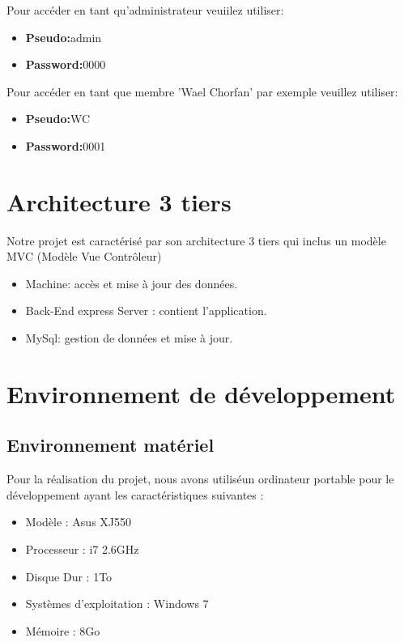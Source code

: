  Pour acc\'{e}der en tant qu'administrateur veuiilez utiliser:

  \begin{itemize}
    \item {\textbf{ Pseudo:}admin}
    \item {\textbf{ Password:}0000}
  \end{itemize}


  Pour acc\'{e}der en tant que membre 'Wael Chorfan' par exemple veuillez utiliser:

  \begin{itemize}
    \item {\textbf{ Pseudo:}WC}
    \item {\textbf{ Password:}0001}
  \end{itemize}




 \section{ Architecture 3 tiers}

Notre projet est caract\'{e}ris\'{e} par son architecture 3 tiers qui inclus un mod\`{e}le MVC (Mod\`{e}le
Vue Contr\^{o}leur)

\begin{itemize}
  \item { Machine: acc\`{e}s et mise \`{a} jour des donn\'{e}es.}
  \item {Back-End express Server : contient l'application.}
  \item {MySql: gestion de donn\'{e}es et mise \`{a} jour.}

\end{itemize}



\section{Environnement de d\'{e}veloppement}

  \subsection{Environnement mat\'{e}riel }

  Pour la r\'{e}alisation du projet, nous avons utilis\'{e}un ordinateur
  portable pour le d\'{e}veloppement ayant les caract\'{e}ristiques suivantes :

\begin{itemize}
  \item {  Mod\`{e}le : Asus XJ550 }
  \item {Processeur : i7 2.6GHz }
  \item {Disque Dur : 1To }
  \item { Syst\`{e}mes d'exploitation : Windows 7  }
  \item {M\'{e}moire : 8Go}

\end{itemize}





